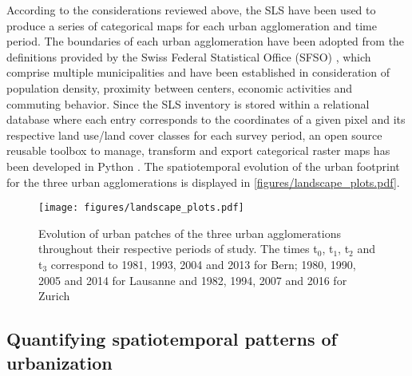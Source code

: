 \documentclass[10pt,letterpaper]{article}
\begin{document}
According to the considerations reviewed above, the SLS have been used to produce a series of categorical maps for each urban agglomeration and time period.
The boundaries of each urban agglomeration have been adopted from the definitions provided by the Swiss Federal Statistical Office (SFSO) \cite{sfso2014espace}, which comprise multiple municipalities and have been established in consideration of population density, proximity between centers, economic activities and commuting behavior.
Since the SLS inventory is stored within a relational database where each entry corresponds to the coordinates of a given pixel and its respective land use/land cover classes for each survey period, an open source reusable toolbox to manage, transform and export categorical raster maps has been developed in Python \cite{bosch2019swisslandstats}.
The spatiotemporal evolution of the urban footprint for the three urban agglomerations is displayed in \autoref{figures/landscape_plots.pdf}.

\begin{figure}[!ht]
  \begin{adjustwidth}{-.4\textwidth}{0cm}
    \centering  
    \texttt{[image: figures/landscape\_plots.pdf]}
    \caption[Evolution of urban patches]{\label{figures/landscape_plots.pdf}Evolution of urban patches of the three urban agglomerations throughout their respective periods of study. The times t$_0$, t$_1$, t$_2$ and t$_3$ correspond to 1981, 1993, 2004 and 2013 for Bern; 1980, 1990, 2005 and 2014 for Lausanne and 1982, 1994, 2007 and 2016 for Zurich}
  \end{adjustwidth}
\end{figure}

\subsection*{Quantifying spatiotemporal patterns of urbanization}
\end{document}
